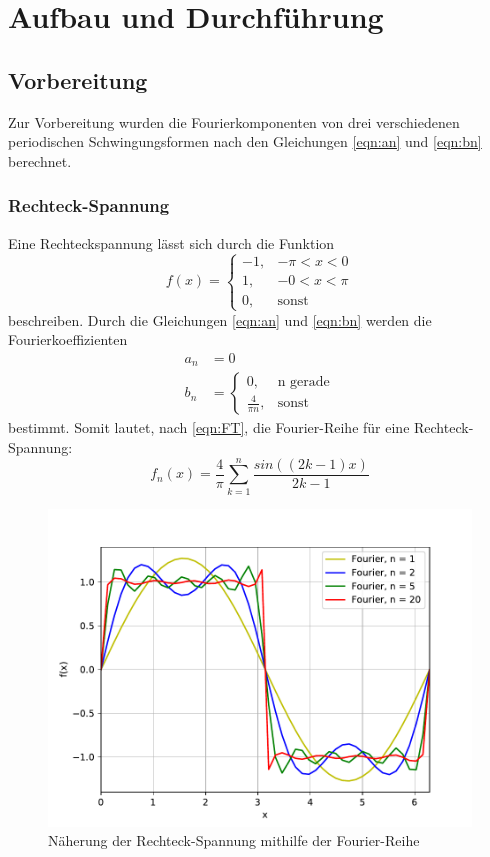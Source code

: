 \section{Aufbau und Durchführung \cite{sample}}
\subsection{Vorbereitung}
Zur Vorbereitung wurden die Fourierkomponenten von drei verschiedenen periodischen Schwingungsformen
nach den Gleichungen \eqref{eqn:an} und \eqref{eqn:bn} berechnet.
\subsubsection{Rechteck-Spannung}
Eine Rechteckspannung lässt sich durch die Funktion
\begin{equation}
  f(x) =
  \begin{cases}
    -1 , & \text{$-\pi < x < 0$} \\
    1 , & \text{$-0 < x < \pi$} \\
     0, & \text{sonst}
\end{cases}
\end{equation}
beschreiben.
Durch die Gleichungen \eqref{eqn:an} und \eqref{eqn:bn} werden die Fourierkoeffizienten
\begin{align}
  a_n &= 0 \\
  b_n &= \begin{cases}
  0, &\text{n gerade}\\
  \frac{4}{\pi n}, &\text{sonst}
  \end{cases}
\end{align}
bestimmt. Somit lautet, nach \eqref{eqn:FT}, die Fourier-Reihe für eine Rechteck-Spannung:
\begin{equation}
  f_n(x) = \frac{4}{\pi}\sum\limits_{k=1}^{n}\frac{sin{((2k-1)x)}}{2k-1}
\end{equation}

\begin{figure}[H]
  \centering
  \includegraphics[scale=0.7]{Plots/Fourier/rf.pdf}
  \caption{Näherung der Rechteck-Spannung mithilfe der Fourier-Reihe}
  \label{fig:rf}
\end{figure}
